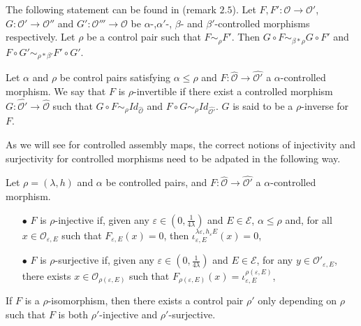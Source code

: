 \begin{rk} \label{rk2.5} The following statement can be found in \cite{OY2} (remark $2.5$). Let $F,F' : \mathcal O\rightarrow \mathcal O'$, $G: \mathcal O'\rightarrow \mathcal O''$ and $G': \mathcal O'''\rightarrow \mathcal O$ be $\alpha$-,$\alpha'$-, $\beta$- and $\beta'$-controlled morphisms respectively. Let $\rho $ be a control pair such that $F\sim_\rho F'$. Then $G\circ F \sim_{\beta\ast\rho}  G\circ F'$ and $F\circ G'\sim_{\rho \ast \beta'} F'\circ G'$.
\end{rk}

\begin{definition}
Let $\alpha$ and $\rho$ be control pairs satisfying $\alpha \leq \rho$ and $F : \hat{\mathcal O} \rightarrow \hat{\mathcal O'}$ a $\alpha$-controlled morphism. We say that $F$ is $\rho$-invertible if there exist a controlled morphism $ G : \hat{\mathcal O'} \rightarrow \hat{\mathcal O}$ such that $G \circ F \sim_\rho Id_{\hat{\mathcal O}}$ and $F\circ G \sim_\rho Id_{\hat{\mathcal O'}}$. $G$ is said to be a $\rho$-inverse for $F$.
\end{definition}

As we will see for controlled assembly maps, the correct notions of injectivity and surjectivity for controlled morphisms need to be adpated in the following way.\\

\begin{definition}
Let $\rho=(\lambda,h)$ and $\alpha$ be controlled pairs, and $F : \hat{\mathcal O} \rightarrow \hat{\mathcal O'}$ a $\alpha$-controlled morphism. 
\begin{itemize}
\item[$\bullet$] $F$ is $\rho$-injective if, given any $\varepsilon \in (0,\frac{1}{4\lambda})$ and $E\in \mathcal E$, $\alpha\leq \rho$ and, for all $x\in \mathcal O_{\varepsilon, E}$ such that $F_{\varepsilon, E}(x)=0$, then $\iota_{\varepsilon, E}^{\lambda\varepsilon, h_\varepsilon E}(x)=0$,
\item[$\bullet$] $F$ is $\rho$-surjective if, given any $\varepsilon \in (0,\frac{1}{4\lambda})$ and $E\in \mathcal E$, for any $y\in \mathcal O' _{\varepsilon, E}$, there exists $x\in \mathcal O_{\rho(\varepsilon,E)}$ such that $F_{\rho(\varepsilon,E)}(x)= \iota_{\varepsilon,E}^{\rho(\varepsilon,E)}$,
\end{itemize}
\end{definition}

\begin{rk}
If $F$ is a $\rho$-isomorphism, then there exists a control pair $\rho'$ only depending on $\rho$ such that $F$ is both $\rho'$-injective and $\rho'$-surjective.
\end{rk}
